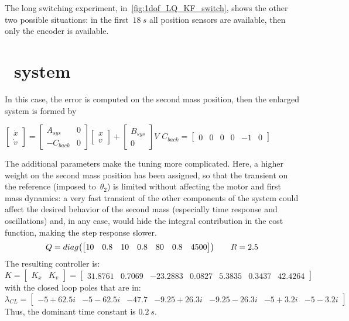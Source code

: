The long switching experiment, in~\cref{fig:1dof_LQ_KF_switch}, shows the other two possible situations: in the first~$18\ s$ all position sensors are available, then only the encoder is available.

\section{\twodof\ system}

In this case, the error is computed on the second mass position, then the enlarged system is formed by
\begin{center}
	$\begin{bmatrix}
		\dot{x} \\
		\dot{v}
	\end{bmatrix}
	=
	\begin{bmatrix}
		A_{sys} & 0 \\
		-C_{back} & 0
	\end{bmatrix}
	\begin{bmatrix}
		x \\
		v
	\end{bmatrix}
	+
	\begin{bmatrix}
		B_{sys} \\
		0
	\end{bmatrix}
	V$		\qquad $ C_{back} =
	\begin{bmatrix}
		0 & 0 & 0 & 0 & -1 & 0
	\end{bmatrix}$
\end{center}

The additional parameters make the tuning more complicated. Here, a higher weight on the second mass position has been assigned, so that the transient on the reference (imposed to~$\theta_2$) is limited without affecting the motor and first mass dynamics: a very fast transient of the other components of the system could affect the desired behavior of the second mass (especially time response and oscillations) and, in any case, would hide the integral contribution in the cost function, making the step response slower.
\[
	Q = diag
	\bigl{(}
	\begin{bmatrix}
		10 & 0.8 & 10 & 0.8 & 80 & 0.8 & 4500
	\end{bmatrix}
	\bigr{)}
	\qquad
	R = 2.5
\]
The resulting controller is:
\begin{equation}
	K =
	\left[
	\begin{array}{c|c}
		K_x & K_v
	\end{array}
	\right]
	=
	\left[
	\begin{array}{cccccc|c}
		31.8761 & 0.7069 & -23.2883 & 0.0827 & 5.3835 & 0.3437 & 42.4264
	\end{array}
	\right]
	\label{eq:2dof_LQ_fastK}
\end{equation}
with the closed loop poles that are in:
\begin{equation}
	\lambda_{CL} =
	\begin{bmatrix}
		-5+62.5i & -5-62.5i & -47.7 & -9.25+26.3i & -9.25-26.3i & -5+3.2i & -5-3.2i 
	\end{bmatrix}
\end{equation}
Thus, the dominant time constant is $0.2\ s$. 

